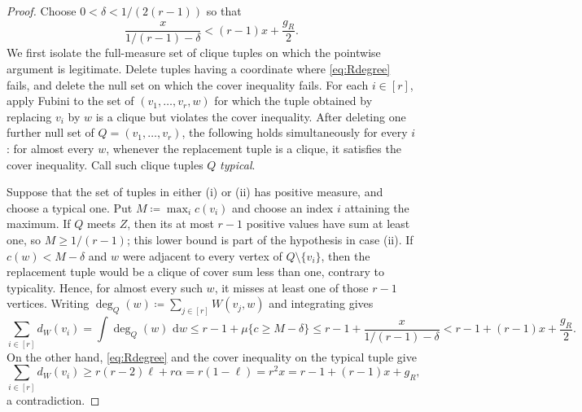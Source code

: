 \documentclass[10pt]{article}
\numberwithin{equation}{section}
\newcommand{\dd}{\,\mathrm d}
\begin{document}
\begin{proof}
Choose $0<\delta<1/(2(r-1))$ so that
\[
 \frac{x}{1/(r-1)-\delta}<(r-1)x+\frac{g_R}{2}.
\]
We first isolate the full-measure set of clique tuples on which the pointwise argument is legitimate.  Delete tuples having a coordinate where \cref{eq:Rdegree} fails, and delete the null set on which the cover inequality fails.  For each $i\in[r]$, apply Fubini to the set of $(v_1,\ldots,v_r,w)$ for which the tuple obtained by replacing $v_i$ by $w$ is a clique but violates the cover inequality.  After deleting one further null set of $Q=(v_1,\ldots,v_r)$, the following holds simultaneously for every $i$: for almost every $w$, whenever the replacement tuple is a clique, it satisfies the cover inequality.  Call such clique tuples $Q$ \emph{typical}.

Suppose that the set of tuples in either \textup{(i)} or \textup{(ii)} has positive measure, and choose a typical one.  Put $M\coloneqq\max_i c(v_i)$ and choose an index $i$ attaining the maximum.  If $Q$ meets $Z$, then its at most $r-1$ positive values have sum at least one, so $M\ge1/(r-1)$; this lower bound is part of the hypothesis in case \textup{(ii)}.  If $c(w)<M-\delta$ and $w$ were adjacent to every vertex of $Q\setminus\{v_i\}$, then the replacement tuple would be a clique of cover sum less than one, contrary to typicality.  Hence, for almost every such $w$, it misses at least one of those $r-1$ vertices.  Writing $\deg_Q(w)\coloneqq\sum_{j\in[r]}W(v_j,w)$ and integrating gives
\[
 \sum_{i\in[r]}d_W(v_i)
 =\int\deg_Q(w)\,\dd w
 \le r-1+\mu\{c\ge M-\delta\}
 \le r-1+\frac{x}{1/(r-1)-\delta}
 <r-1+(r-1)x+\frac{g_R}{2}.
\]
On the other hand, \cref{eq:Rdegree} and the cover inequality on the typical tuple give
\[
 \sum_{i\in[r]}d_W(v_i)
 \ge r(r-2)\ell+r\alpha
 =r(1-\ell)=r^2x
 =r-1+(r-1)x+g_R,
\]
a contradiction.
\end{proof}
\end{document}
